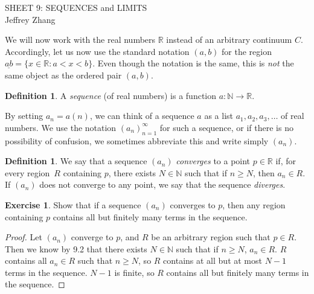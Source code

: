 \documentclass[12pt]{article}
\newcommand{\bbN}{\mathbb{N}}
\newcommand{\bbR}{\mathbb{R}}
\providecommand{\arr}{\longrightarrow}
\renewcommand{\_}[1]{\underline{ #1 }}
\theoremstyle{definition}
\newtheorem{definition}[theorem]{Definition}
\newtheorem{exercise}[theorem]{Exercise}
\numberwithin{equation}{subsection}
\begin{document}
\begin{center}
{\large SHEET 9: SEQUENCES and LIMITS} \\ 
\vspace{.2in}  
Jeffrey Zhang
\end{center}

\bigskip \bigskip


\setcounter{section}{9}   


We will now work with the real numbers $\bbR$ instead of an arbitrary continuum $C$.  
Accordingly, let us now use the standard notation $(a, b)$ for the region 
$\_{ab} = \{ x \in \bbR : a < x < b \}$.  Even though the notation is the same, this is \emph{not} the same object as the ordered pair $(a, b)$.


\begin{definition}  A \emph{sequence} (of real numbers) is a function $a \colon \bbN \arr \bbR$.
\end{definition}

\noindent By setting $a_n = a(n)$, we can think of a sequence $a$ as a list $a_1, a_2, a_3, \dotsc$ of real numbers.  We use the notation $(a_n)_{n=1}^{\infty}$ for such a sequence, or if there is no possibility of confusion, we sometimes abbreviate this and write simply $(a_n)$.  %

\begin{definition}  
We say that a sequence $(a_n)$ \emph{converges} to a point $p \in \bbR$ if, for every region~$R$ containing $p$, there exists $N\in \bbN$ such that if $n\geq N$, then $a_n\in R$.
If $(a_n)$ does not converge to any point, we say
that the sequence \emph{diverges}.
\end{definition}

\begin{exercise}
Show that if a sequence $(a_n)$ converges to $p$, then any region containing $p$ contains all
but finitely many terms in the sequence.
\end{exercise}

\begin{proof}
Let $(a_n)$ converge to $p$, and $R$ be an arbitrary region such that $p \in R$. Then we know by 9.2 that there exists $N \in \bbN$ such that if $n \geq N$, $a_n \in R$. $R$ contains all $a_n \in R$ such that $n \geq N$, so $R$ contains at all but at most $N - 1$ terms in the sequence. $N - 1$ is finite, so $R$ contains all but finitely many terms in the sequence.
\end{proof}
\end{document}
